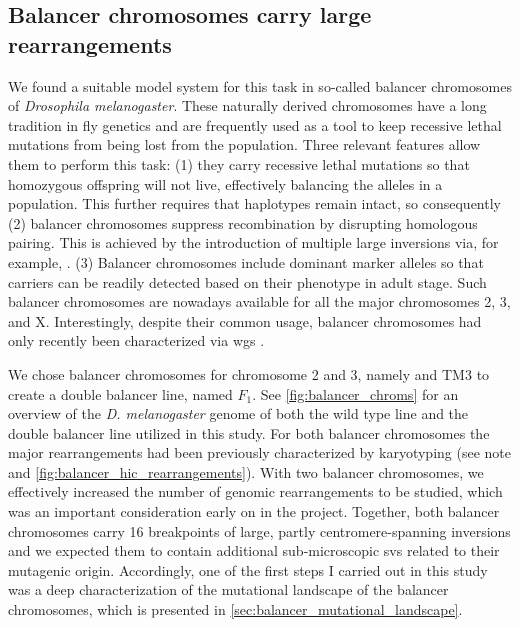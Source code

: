 \subsection{Balancer chromosomes carry large rearrangements}
\label{sec:balancer_balancers}

We found a suitable model system for this task in so-called balancer chromosomes
of \textit{Drosophila melanogaster}. These naturally derived chromosomes have a
long tradition in fly genetics and are frequently used as a tool to keep
recessive lethal mutations from being lost from the population. Three relevant
features allow them to perform this task: (1) they carry recessive lethal
mutations so that homozygous offspring will not live, effectively balancing the
alleles in a population. This further requires that haplotypes remain intact,
so consequently (2) balancer chromosomes
suppress recombination by disrupting homologous pairing. This is achieved by the
introduction of multiple large inversions via, for example,
.
(3) Balancer chromosomes include dominant marker alleles so that carriers can be
readily detected based on their phenotype in adult stage. Such balancer
chromosomes are nowadays available for all the major chromosomes 2, 3, and X.
Interestingly, despite their common usage, balancer chromosomes had
only recently been characterized via \acl{wgs} \citep{Miller2016,Miller2018}.

We chose balancer chromosomes for chromosome 2 and 3, namely 
and TM3 \citep{Tinderholt1960} to create a double balancer line, named $F_1$.
See \cref{fig:balancer_chroms} for an overview of the \textit{D. melanogaster}
genome of both the wild type line and the double balancer line utilized in this
study. For both balancer chromosomes the major rearrangements had been
previously characterized by karyotyping (see
note and
\cref{fig:balancer_hic_rearrangements}). With two balancer chromosomes,
we effectively increased the number of genomic rearrangements to
be studied, which was an important consideration early on in the project.
Together, both balancer chromosomes carry 16 breakpoints of large, partly
centromere-spanning inversions and we expected them to contain additional
sub-microscopic \acp{sv} related to their mutagenic origin. Accordingly, one of
the first steps I carried out in this study was a deep characterization of the mutational
landscape  of the balancer chromosomes, which is presented in
\cref{sec:balancer_mutational_landscape}.





